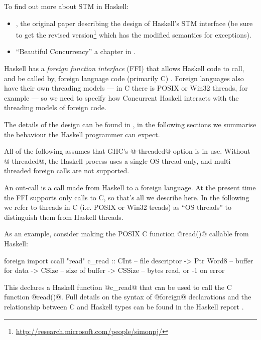 
To find out more about STM in Haskell:

\begin{itemize}
\item \citet{stm}, the original paper describing the design of
  Haskell's STM interface (be sure to get the revised
  version\footnote{\url{http://research.microsoft.com/people/simonpj/}}
  which has the modified semantics for exceptions).
\item ``Beautiful Concurrency'' a chapter in \citet{beautiful-code}.
\end{itemize}


Haskell has a \emph{foreign function interface} (FFI) that allows
Haskell code to call, and be called by, foreign language code
(primarily C) \cite{haskell2010}.  Foreign languages also have their
own threading models --- in C there is POSIX or Win32 threads, for
example --- so we need to specify how Concurrent Haskell interacts
with the threading models of foreign code.

The details of the design can be found in \citet{conc-ffi}, in the
following sections we summarise the behaviour the Haskell programmer
can expect.

All of the following assumes that GHC's @-threaded@ option is in use.
Without @-threaded@, the Haskell process uses a single OS thread only,
and multi-threaded foreign calls are not supported.


An out-call is a call made from Haskell to a foreign language.  At the
present time the FFI supports only calls to C, so that's all we
describe here.  In the following we refer to threads in C (i.e. POSIX
or Win32 treads) as ``OS threads'' to distinguish them from Haskell
threads.

As an example, consider making the POSIX C function @read()@ callable
from Haskell:

\begin{haskell}
foreign import ccall "read"
   c_read :: CInt      -- file descriptor
          -> Ptr Word8 -- buffer for data
          -> CSize     -- size of buffer
          -> CSSize    -- bytes read, or -1 on error
\end{haskell}

\noindent This declares a Haskell function @c_read@ that can be used
to call the C function @read()@.  Full details on the syntax of
@foreign@ declarations and the relationship between C and Haskell
types can be found in the Haskell report \cite{haskell2010}.


